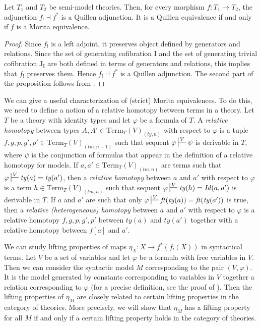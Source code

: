 \documentclass[reqno]{amsart}
\theoremstyle{definition}
\theoremstyle{remark}
\newcommand{\Term}{\mathrm{Term}}
\newcommand{\Id}{\mathit{Id}}
\newcommand{\ft}{\mathit{ft}}
\newcommand{\ty}{\mathit{ty}}
\newcommand{\tm}{\mathit{tm}}
\newcommand{\I}{\mathrm{I}}
\newcommand{\J}{\mathrm{J}}
\numberwithin{figure}{section}
\begin{document}
\begin{prop}
Let $T_1$ and $T_2$ be semi-model theories.
Then, for every morphism $f : T_1 \to T_2$, the adjunction $f_! \dashv f^*$ is a Quillen adjunction.
It is a Quillen equivalence if and only if $f$ is a Morita equivalence.
\end{prop}
\begin{proof}
Since $f_!$ is a left adjoint, it preserves object defined by generators and relations.
Since the set of generating cofibration $\I$ and the set of generating trivial cofibration $\J_\I$
are both defined in terms of generators and relations, this implies that $f_!$ preserves them.
Hence $f_! \dashv f^*$ is a Quillen adjunction.
The second part of the proposition follows from \cite[Corollary~3.9]{f-model-structures}.
\end{proof}

We can give a useful characterization of (strict) Morita equivalences.
To do this, we need to define a notion of a relative homotopy between terms in a theory.
Let $T$ be a theory with identity types and let $\varphi$ be a formula of $T$.
A \emph{relative homotopy} between types $A,A' \in \Term_T(V)_{(\ty,n)}$ with respect to $\varphi$ is a tuple $f,g,p,g',p' \in \Term_T(V)_{(\tm,n+1)}$
such that sequent $\varphi \sststile{}{V} \psi$ is derivable in $T$, where $\psi$ is the conjunction of formulas that appear in the definition of a relative homotopy for models.
If $a,a' \in \Term_T(V)_{(\tm,n)}$ are terms such that $\varphi \sststile{}{V} \ty(a) = \ty(a')$, then a \emph{relative homotopy} between $a$ and $a'$ with respect to $\varphi$ is a term $h \in \Term_T(V)_{(\tm,n)}$
such that sequent $\varphi \sststile{}{V} \ty(h) = \Id(a,a')$ is derivable in $T$.
If $a$ and $a'$ are such that only $\varphi \sststile{}{V} \ft(\ty(a)) = \ft(\ty(a'))$ is true, then a \emph{relative (heterogeneous) homotopy} between $a$ and $a'$ with respect to $\varphi$
is a relative homotopy $f,g,p,g',p'$ between $\ty(a)$ and $\ty(a')$ together with a relative homotopy between $f[a]$ and $a'$.

We can study lifting properties of maps $\eta_X : X \to f^*(f_!(X))$ in syntactical terms.
Let $V$ be a set of variables and let $\varphi$ be a formula with free variables in $V$.
Then we can consider the syntactic model $M$ corresponding to the pair $(V,\varphi)$.
It is the model generated by constants corresponding to variables in $V$ together a relation corresponding to $\varphi$ (for a precise definition, see the proof of ).
Then the lifting properties of $\eta_M$ are closely related to certain lifting properties in the category of theories.
More precisely, we will show that $\eta_M$ has a lifting property for all $M$ if and only if a certain lifting property holds in the category of theories.
\end{document}
